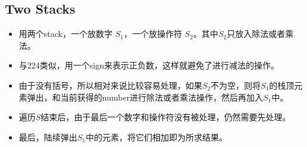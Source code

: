 \subsection{Two Stacks}
\begin{CJK*}{UTF8}{gbsn}
\begin{itemize}
\item 用两个stack，一个放数字 $S_1$，一个放操作符 $S_2$。其中$S_2$只放入除法或者乘法。
\item 与224类似，用一个sign来表示正负数，这样就避免了进行减法的操作。
\item 由于没有括号，所以相对来说比较容易处理，如果$S_2$不为空，则将$S_1$的栈顶元素弹出，和当前获得的number进行除法或者乘法操作，然后再加入$S_1$中。
\item 遍历$S$结束后，由于最后一个数字和操作符没有被处理，仍然需要先处理。
\item 最后，陆续弹出$S_1$中的元素，将它们相加即为所求结果。
\end{itemize}
\end{CJK*}

